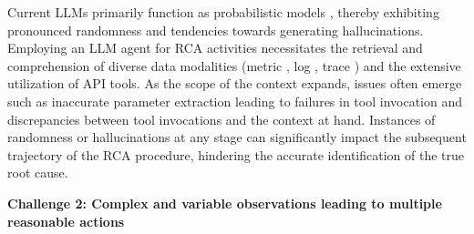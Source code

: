 

Current LLMs primarily function as probabilistic models \citep{radford2018gpt,radford2019gpt2}, thereby exhibiting pronounced randomness and tendencies towards generating hallucinations. Employing an LLM agent for RCA activities necessitates the retrieval and comprehension of diverse data modalities (metric \citep{metric6}, log \citep{log2}, trace \citep{yaosparserca}) and the extensive utilization of API tools. As the scope of the context expands, issues often emerge such as inaccurate parameter extraction leading to failures in tool invocation and discrepancies between tool invocations and the context at hand. Instances of randomness or hallucinations at any stage can significantly impact the subsequent trajectory of the RCA procedure, hindering the accurate identification of the true root cause.


\noindent\textbf{Challenge 2: Complex and variable observations leading to multiple reasonable actions}





